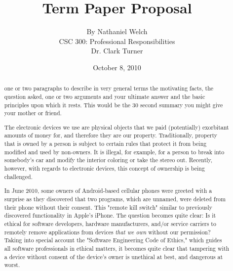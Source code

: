 \documentclass[12pt]{article}
\begin{document}
\title{\vfill Term Paper Proposal} %
\author{
 By Nathaniel Welch \vspace{10pt} \\ 
CSC 300: Professional Responsibilities  \vspace{10pt} \\ 
Dr. Clark Turner \vspace{10pt} \\ 
}
\date{October 8, 2010} %

\maketitle

\vfill  %
\begin{abstract}
one or two paragraphs to describe in very general terms the motivating facts, the question asked, one or two arguments and your ultimate answer and the basic principles upon which it rests. This would be the 30 second summary you might give your mother or friend. \cite{handout}

The electronic devices we use are physical objects that we paid (potentially) exorbitant amounts of money for, and therefore they are our property. Traditionally, property that is owned by a person is subject to certain rules that protect it from being modified and used by non-owners. It is illegal, for example, for a person to break into somebody's car and modify the interior coloring or take the stereo out. Recently, however, with regards to electronic devices, this concept of ownership is being challenged.

In June 2010, some owners of Android-based cellular phones were greeted with a surprise as they discovered that two programs, which are unnamed, were deleted from their phone without their consent. \cite{AndroidBlog} This "remote kill switch" similar to previously discovered functionality in Apple's iPhone. \cite{iPhoneKill} The question becomes quite clear: Is it ethical for software developers, hardware manufacturers, and/or service carriers to remotely remove applications from devices \emph{that we own} without our permission? Taking into special account the "Software Engineering Code of Ethics," which guides all software professionals in ethical matters, it becomes quite clear that tampering with a device without consent of the device's owner is unethical at best, and dangerous at worst.
\end{abstract}
\end{document}
